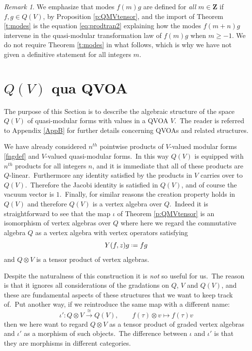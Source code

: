 \documentclass[12pt]{amsart}
\theoremstyle{plain}
\theoremstyle{definition}
\theoremstyle{remark}
\newtheorem{rmk}[thm]{Remark}
\newcommand*{\df}{\mathrel{\vcenter{\baselineskip0.5ex \lineskiplimit0pt
                     \hbox{\scriptsize.}\hbox{\scriptsize.}}} =}
\newcommand{\ZZ}{\mathbf{Z}}
\begin{document}
\begin{rmk}
We emphasize that modes $f(m)g$ are defined for \emph{all} $m \in \ZZ$ if $f,g \in Q(V)$, by Proposition \ref{p:QMVtensor}, and the import of Theorem \ref{t:modes} is the equation \eqref{eq:prodtran2} explaining how the modes $f(m+n)g$ intervene in the quasi-modular transformation law of $f(m)g$ when $m\geq -1$. We do not require Theorem \ref{t:modes} in what follows, which is why we have not given a definitive statement for all integers $m$.
\end{rmk}

\section{\texorpdfstring{$Q(V)$}{Q(V)} qua QVOA}
\label{s:QVOA}
The purpose of this Section is to describe the algebraic structure of the space $Q(V)$ of quasi-modular forms with values in a QVOA $V$.\ The reader is referred to Appendix \ref{AppB} for further details concerning QVOAs and related structures.

We have already considered $n^{th}$ pointwise products of $V$-valued modular forms \eqref{fngdef} and $V$-valued quasi-modular forms.\ In this way $Q(V)$ is equipped with $n^{th}$ products for all integers $n$, and it is immediate that all of these products are $Q$-linear.\ Furthermore any identity satisfied by the products in $V$ carries  over to $Q(V)$.\ Therefore the Jacobi identity is satisfied in $Q(V)$, and of course the vacuum vector is $1$.\ Finally, for similar reasons the creation property holds in $Q(V)$ and therefore $Q(V)$ is a vertex algebra over $Q$.\ Indeed it is straightforward to see that the map $\iota$ of Theorem \ref{p:QMVtensor}
is an isomorphism of vertex algebras over $Q$ where here we regard the commutative algebra $Q$ as a vertex algebra with vertex operators satisfying 
\[Y(f, z)g\df fg\] 
and $Q\otimes V$ is a tensor product of vertex algebras.

Despite the naturalness of this construction it is \emph{not} so useful for us.\ The reason is that it ignores all considerations of the gradations on $Q$, $V$ and $Q(V)$, and these are fundamental aspects of these structures that we want to keep track of.\ Put another way, if we reintroduce the same map with a different name:
 \begin{equation}
    \label{QV=QVQ}
\iota': Q\otimes V \stackrel{\cong}{\longrightarrow} Q(V),\quad\quad f(\tau)\otimes v \mapsto f(\tau)v
\end{equation}
then we here want to regard $Q\otimes V$ as a tensor product of graded vertex algebras and $\iota'$ as a morphism of such objects.\ The difference between $\iota$ and $\iota'$ is that they are morphisms in different categories.
\end{document}
